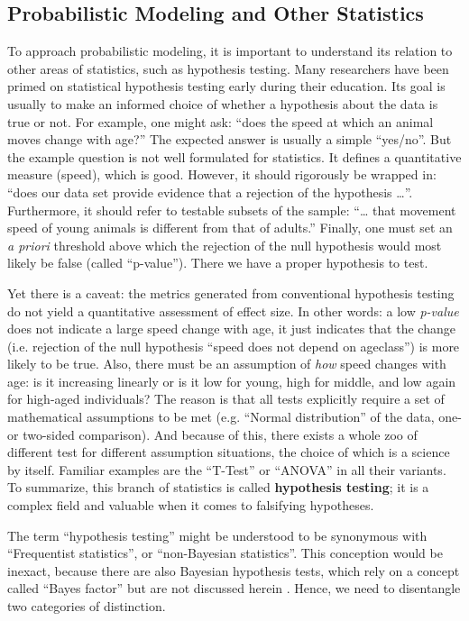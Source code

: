 \subsection{Probabilistic Modeling and Other Statistics}
\label{sec:org0cc6a35}
To approach probabilistic modeling, it is important to understand its relation to other areas of statistics, such as hypothesis testing.
Many researchers have been primed on statistical hypothesis testing early during their education.
Its goal is usually to make an informed choice of whether a hypothesis about the data is true or not.
For example, one might ask: ``does the speed at which an animal moves change with age?''
The expected answer is usually a simple ``yes/no''.
But the example question is not well formulated for statistics.
It defines a quantitative measure (speed), which is good.
However, it should rigorously be wrapped in: ``does our data set provide evidence that a rejection of the hypothesis \ldots{}''.
Furthermore, it should refer to testable subsets of the sample: ``\ldots{} that movement speed of young animals is different from that of adults.''
Finally, one must set an \emph{a priori} threshold above which the rejection of the null hypothesis would most likely be false (called ``p-value'').
There we have a proper hypothesis to test.

Yet there is a caveat: the metrics generated from conventional hypothesis testing do not yield a quantitative assessment of effect size.
In other words: a low \emph{p-value} does not indicate a large speed change with age, it just indicates that the change (i.e. rejection of the null hypothesis ``speed does not depend on ageclass'') is more likely to be true.
Also, there must be an assumption of \emph{how} speed changes with age: is it increasing linearly or is it low for young, high for middle, and low again for high-aged individuals?
The reason is that all tests explicitly require a set of mathematical assumptions to be met (e.g. ``Normal distribution'' of the data, one- or two-sided comparison).
And because of this, there exists a whole zoo of different test for different assumption situations, the choice of which is a science by itself.
Familiar examples are the ``T-Test'' or ``ANOVA'' in all their variants.
To summarize, this branch of statistics is called \textbf{hypothesis testing}; it is a complex field and valuable when it comes to falsifying hypotheses.

The term ``hypothesis testing'' might be understood to be synonymous with ``Frequentist statistics'', or ``non-Bayesian statistics''.
This conception would be inexact, because there are also Bayesian hypothesis tests, which rely on a concept called ``Bayes factor'' but are not discussed herein \citep[/cf./][]{Shikano2019}.
Hence, we need to disentangle two categories of distinction.


